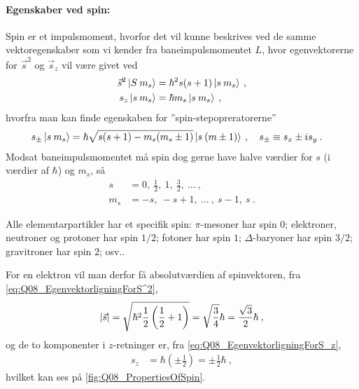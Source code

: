 \paragraph{Egenskaber ved spin:} Spin er et impulsmoment, hvorfor det vil kunne beskrives ved de samme vektoregenskaber som vi kender fra baneimpulsmomentet $L$, hvor egenvektorerne for $\Vec{s}^2$ og $\Vec{s}_z$ vil være givet ved
\begin{align}
    \Vec{s}^2\ket{S \: m_s} &= \hbar^2 s(s+1) \ket{s \: m_s} \label{eq:Q08_EgenvektorligningForS^2} \: , \\
    s_z\ket{s \: m_s} &= \hbar m_s \ket{s \: m_s} \: , \label{eq:Q08_EgenvektorligningForS_z}
\end{align}
hvorfra man kan finde egenskaben for ''spin-stepopreratorerne''
\begin{align}
    s_\pm \ket{s \: m_s} &= \hbar \sqrt{s(s+1) - m_s(m_s \pm 1)} \ket{s \: (m \pm 1)} \: , \quad s_\pm \equiv s_x \pm i s_y \: .
\end{align}
\noindent
Modsat baneimpulsmomentet må spin dog gerne have halve værdier for $s$ (i værdier af $\hbar$) og $m_s$, så
\begin{align}
    s &= 0, \: \frac{1}{2}, \: 1, \: \frac{3}{2}, \: \ldots \: , \\
    m_s &= -s, \: -s + 1, \: \ldots \: , \: s - 1, \: s \: .
\end{align}

Alle elementarpartikler har et specifik spin: $\pi$-mesoner har spin $0$; elektroner, neutroner og protoner har spin $1/2$; fotoner har spin $1$; $\Delta$-baryoner har spin $3/2$; gravitroner har spin $2$; osv..

\noindent
For en elektron vil man derfor få absolutværdien af spinvektoren, fra \cref{eq:Q08_EgenvektorligningForS^2},
\begin{align}
    \abs{\Vec{s}} &= \sqrt{\hbar^2 \frac{1}{2}\left(\frac{1}{2}+1\right)} = \sqrt{\frac{3}{4}}\hbar = \frac{\sqrt{3}}{2} \hbar  \: , \\
\end{align}
og de to komponenter i $z$-retninger er, fra \cref{eq:Q08_EgenvektorligningForS_z},
\begin{align}
    s_z &= \hbar \left(\pm \frac{1}{2}\right) = \pm \frac{1}{2}\hbar \: ,
\end{align}
hvilket kan ses på \cref{fig:Q08_PropertiesOfSpin}.

